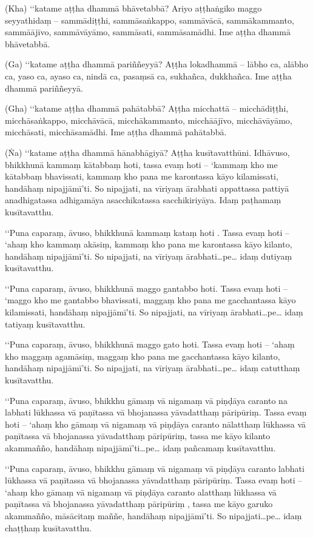 (Kha) ‘‘katame aṭṭha dhammā bhāvetabbā? Ariyo aṭṭhaṅgiko maggo seyyathidaṃ – sammādiṭṭhi, sammāsaṅkappo, sammāvācā, sammākammanto, sammāājīvo, sammāvāyāmo, sammāsati, sammāsamādhi. Ime aṭṭha dhammā bhāvetabbā.

(Ga) ‘‘katame aṭṭha dhammā pariññeyyā? Aṭṭha lokadhammā – lābho ca, alābho ca, yaso ca, ayaso ca, nindā ca, pasaṃsā ca, sukhañca, dukkhañca. Ime aṭṭha dhammā pariññeyyā.

(Gha) ‘‘katame aṭṭha dhammā pahātabbā? Aṭṭha micchattā – micchādiṭṭhi, micchāsaṅkappo, micchāvācā, micchākammanto, micchāājīvo, micchāvāyāmo, micchāsati, micchāsamādhi. Ime aṭṭha dhammā pahātabbā.

(Ṅa) ‘‘katame aṭṭha dhammā hānabhāgiyā? Aṭṭha kusītavatthūni. Idhāvuso, bhikkhunā kammaṃ kātabbaṃ hoti, tassa evaṃ hoti – ‘kammaṃ kho me kātabbaṃ bhavissati, kammaṃ kho pana me karontassa kāyo kilamissati, handāhaṃ nipajjāmī’ti. So nipajjati, na vīriyaṃ ārabhati appattassa pattiyā anadhigatassa adhigamāya asacchikatassa sacchikiriyāya. Idaṃ paṭhamaṃ kusītavatthu.

‘‘Puna caparaṃ, āvuso, bhikkhunā kammaṃ kataṃ hoti . Tassa evaṃ hoti – ‘ahaṃ kho kammaṃ akāsiṃ, kammaṃ kho pana me karontassa kāyo kilanto, handāhaṃ nipajjāmī’ti. So nipajjati, na vīriyaṃ ārabhati…pe… idaṃ dutiyaṃ kusītavatthu.

‘‘Puna caparaṃ, āvuso, bhikkhunā maggo gantabbo hoti. Tassa evaṃ hoti – ‘maggo kho me gantabbo bhavissati, maggaṃ kho pana me gacchantassa kāyo kilamissati, handāhaṃ nipajjāmī’ti. So nipajjati, na vīriyaṃ ārabhati…pe… idaṃ tatiyaṃ kusītavatthu.

‘‘Puna caparaṃ, āvuso, bhikkhunā maggo gato hoti. Tassa evaṃ hoti – ‘ahaṃ kho maggaṃ agamāsiṃ, maggaṃ kho pana me gacchantassa kāyo kilanto, handāhaṃ nipajjāmī’ti. So nipajjati, na vīriyaṃ ārabhati…pe… idaṃ catutthaṃ kusītavatthu.

‘‘Puna caparaṃ, āvuso, bhikkhu gāmaṃ vā nigamaṃ vā piṇḍāya caranto na labhati lūkhassa vā paṇītassa vā bhojanassa yāvadatthaṃ pāripūriṃ. Tassa evaṃ hoti – ‘ahaṃ kho gāmaṃ vā nigamaṃ vā piṇḍāya caranto nālatthaṃ lūkhassa vā paṇītassa vā bhojanassa yāvadatthaṃ pāripūriṃ, tassa me kāyo kilanto akammañño, handāhaṃ nipajjāmī’ti…pe… idaṃ pañcamaṃ kusītavatthu.

‘‘Puna caparaṃ, āvuso, bhikkhu gāmaṃ vā nigamaṃ vā piṇḍāya caranto labhati lūkhassa vā paṇītassa vā bhojanassa yāvadatthaṃ pāripūriṃ. Tassa evaṃ hoti – ‘ahaṃ kho gāmaṃ vā nigamaṃ vā piṇḍāya caranto alatthaṃ lūkhassa vā paṇītassa vā bhojanassa yāvadatthaṃ pāripūriṃ , tassa me kāyo garuko akammañño, māsācitaṃ maññe, handāhaṃ nipajjāmī’ti. So nipajjati…pe… idaṃ chaṭṭhaṃ kusītavatthu.

